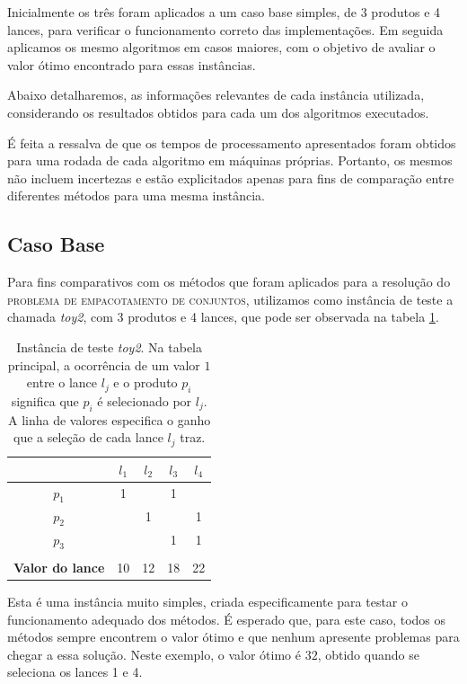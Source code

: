 \documentclass{article}
\begin{document}
	Inicialmente os três foram aplicados a um caso base simples, de 3 produtos e 4 lances, para verificar o funcionamento correto das implementações. Em seguida aplicamos os mesmo algoritmos em casos maiores, com o objetivo de avaliar o valor ótimo encontrado para essas instâncias. 
	
	Abaixo detalharemos, as informações relevantes de cada instância utilizada, considerando os resultados obtidos para cada um dos algoritmos executados.
	
	É feita a ressalva de que os tempos de processamento apresentados foram obtidos para uma rodada de cada algoritmo em máquinas próprias. Portanto, os mesmos não incluem incertezas e estão explicitados apenas para fins de comparação entre diferentes métodos para uma mesma instância.
	
		\subsection{Caso Base} \label{sec:caso}
	    Para fins comparativos com os métodos que foram aplicados para a resolução do \textsc{problema de empacotamento de conjuntos}, utilizamos como instância de teste a chamada \textit{toy2}, com 3 produtos e 4 lances, que pode ser observada na tabela \ref{tab:toy2}.
	    
	    \begin{table}[h]
	        \centering
	        \begin{tabular}{|c|c|c|c|c|}
	            \hline
	            \backslashbox{\bf Produto}{\bf Lance} & $ l_1 $ & $ l_2 $ & $ l_3 $ & $ l_4 $ \\\hline
	            $ p_1 $ & 1 & & 1 & \\\hline
	            $ p_2 $ & & 1 & & 1\\\hline
	            $ p_3 $ & & & 1 & 1 \\\hline
	            \multicolumn{5}{c}{\quad} \\\hline
	            \textbf{Valor do lance} & 10 & 12 & 18 & 22 \\\hline
	        \end{tabular}
	        \caption{Instância de teste \textit{toy2}. Na tabela principal, a ocorrência de um valor $1$ entre o lance $l_j$ e o produto $p_i$ significa que $p_i$ é selecionado por $l_j$.
	        A linha de valores especifica o ganho que a seleção de cada lance $l_j$ traz.}
	        \label{tab:toy2}
	    \end{table}
	    
	    Esta é uma instância muito simples, criada especificamente para testar o funcionamento adequado dos métodos. É esperado que, para este caso, todos os métodos sempre encontrem o valor ótimo e que nenhum apresente problemas para chegar a essa solução. Neste exemplo, o valor ótimo é $32$, obtido quando se seleciona os lances 1 e 4.
	    
\end{document}
